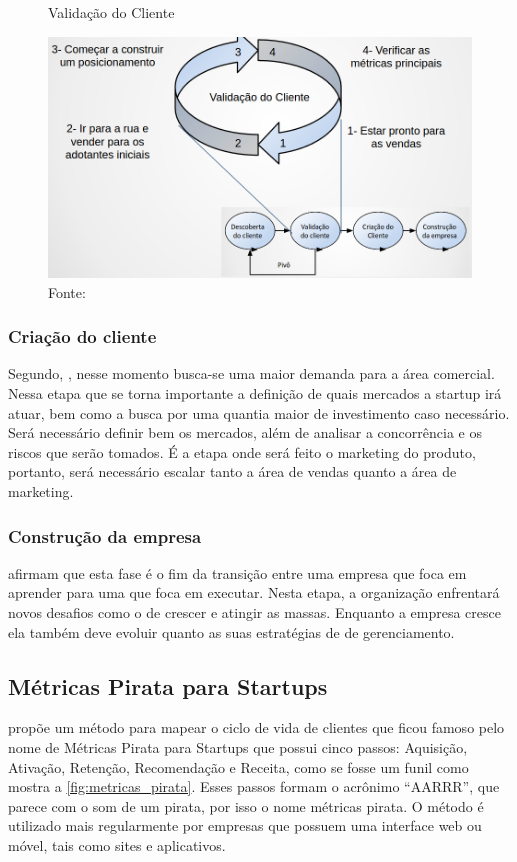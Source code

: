 \begin{figure}[H]
\caption{Validação do Cliente}
\centerline{\includegraphics[scale=0.3]{img/validacao_do_cliente}}
\label{fig:validacao_do_cliente}
\caption* {Fonte: }
\end{figure}

\subsubsection{Criação do cliente}
\label{cha:criacao_do_cliente}
Segundo, , nesse momento busca-se uma maior demanda para a área comercial. Nessa etapa que se torna importante a definição de quais mercados a startup irá atuar, bem como a busca por uma quantia maior de investimento caso necessário. Será necessário definir bem os mercados, além de analisar a concorrência e os riscos que serão tomados. É a etapa onde será feito o marketing do produto, portanto, será necessário escalar tanto a área de vendas quanto a área de marketing.

\subsubsection{Construção da empresa}
\label{cha:construcao_da_empresa}
 afirmam que esta fase é o fim da transição entre uma empresa que foca em aprender para uma que foca em executar. Nesta etapa, a organização enfrentará novos desafios como o de crescer e atingir as massas. Enquanto a empresa cresce ela também deve evoluir quanto as suas estratégias de de gerenciamento.

\subsection{Métricas Pirata para Startups}
\label{cha:metricas_pirata}
 propõe um método para mapear o ciclo de vida de clientes que ficou famoso pelo nome de Métricas Pirata para Startups que possui cinco passos: Aquisição, Ativação, Retenção, Recomendação e Receita, como se fosse um funil como mostra a \autoref{fig:metricas_pirata}. Esses passos formam o acrônimo \enquote{AARRR}, que parece com o som de um pirata, por isso o nome métricas pirata.
O método é utilizado mais regularmente por empresas que possuem uma interface web ou móvel, tais como sites e aplicativos.


